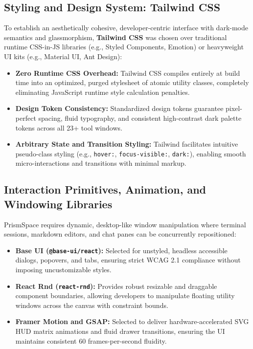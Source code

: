 \documentclass[12pt,a4paper]{report}
\begin{document}
\subsection{Styling and Design System: Tailwind CSS}
To establish an aesthetically cohesive, developer-centric interface with dark-mode semantics and glassmorphism, \textbf{Tailwind CSS} was chosen over traditional runtime CSS-in-JS libraries (e.g., Styled Components, Emotion) or heavyweight UI kits (e.g., Material UI, Ant Design):
\begin{itemize}
    \item \textbf{Zero Runtime CSS Overhead:} Tailwind CSS compiles entirely at build time into an optimized, purged stylesheet of atomic utility classes, completely eliminating JavaScript runtime style calculation penalties.
    \item \textbf{Design Token Consistency:} Standardized design tokens guarantee pixel-perfect spacing, fluid typography, and consistent high-contrast dark palette tokens across all 23+ tool windows.
    \item \textbf{Arbitrary State and Transition Styling:} Tailwind facilitates intuitive pseudo-class styling (e.g., \texttt{hover:}, \texttt{focus-visible:}, \texttt{dark:}), enabling smooth micro-interactions and transitions with minimal markup.
\end{itemize}

\subsection{Interaction Primitives, Animation, and Windowing Libraries}
PrismSpace requires dynamic, desktop-like window manipulation where terminal sessions, markdown editors, and chat panes can be concurrently repositioned:
\begin{itemize}
    \item \textbf{Base UI (\texttt{@base-ui/react}):} Selected for unstyled, headless accessible dialogs, popovers, and tabs, ensuring strict WCAG 2.1 compliance without imposing uncustomizable styles.
    \item \textbf{React Rnd (\texttt{react-rnd}):} Provides robust resizable and draggable component boundaries, allowing developers to manipulate floating utility windows across the canvas with constraint bounds.
    \item \textbf{Framer Motion and GSAP:} Selected to deliver hardware-accelerated SVG HUD matrix animations and fluid drawer transitions, ensuring the UI maintains consistent 60 frames-per-second fluidity.
\end{itemize}
\end{document}
